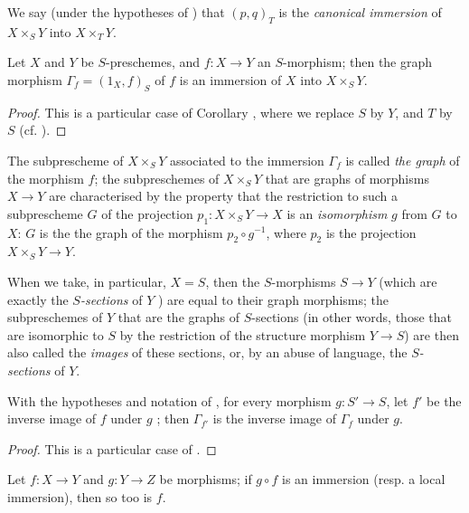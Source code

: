 We say (under the hypotheses of ) that $(p,q)_T$ is the \emph{canonical immersion} of $X\times_S Y$ into $X\times_T Y$.

\begin{corollary}[5.3.11]
\label{I.5.3.11}
Let $X$ and $Y$ be $S$-preschemes, and $f:X\to Y$ an $S$-morphism;
then the graph morphism $\Gamma_f=(1_X,f)_S$ of $f$  is an immersion of $X$ into $X\times_S Y$.
\end{corollary}

\begin{proof}
This is a particular case of Corollary , where we replace $S$ by $Y$, and $T$ by $S$ (cf. ).
\end{proof}

The subprescheme of $X\times_S Y$ associated to the immersion $\Gamma_f$  is called \emph{the graph} of the morphism $f$;
the subpreschemes of $X\times_S Y$ that are graphs of morphisms $X\to Y$ are characterised by the property that the restriction to such a subprescheme $G$ of the projection $p_1:X\times_S Y\to X$ is an \emph{isomorphism} $g$ from $G$ to $X$:
$G$ is the the graph of the morphism $p_2\circ g^{-1}$, where $p_2$ is the projection $X\times_S Y\to Y$.

When we take, in particular, $X=S$, then the $S$-morphisms $S\to Y$ (which are exactly the \emph{$S$-sections} of $Y$ ) are equal to their graph morphisms;
the subpreschemes of $Y$ that are the graphs of $S$-sections (in other words, those that are isomorphic to $S$ by the restriction of the structure morphism $Y\to S$) are then also called the \emph{images} of these sections, or, by an abuse of language, the \emph{$S$-sections} of $Y$.

\begin{corollary}[5.3.12]
\label{I.5.3.12}
With the hypotheses and notation of , for every morphism $g:S'\to S$, let $f'$ be the inverse image of $f$ under $g$ ;
then $\Gamma_{f'}$ is the inverse image of $\Gamma_f$ under $g$.
\end{corollary}

\begin{proof}
This is a particular case of .
\end{proof}

\begin{corollary}[5.3.13]
\label{I.5.3.13}
Let $f:X\to Y$ and $g:Y\to Z$ be morphisms;
if $g\circ f$ is an immersion (resp. a local immersion), then so too is $f$.
\end{corollary}

